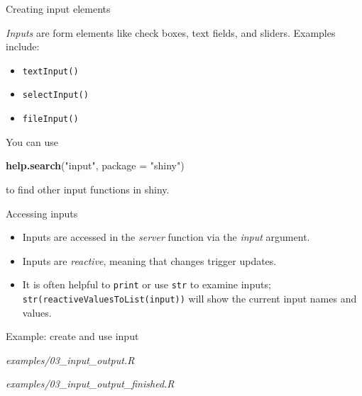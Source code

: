 \documentclass[
  12pt,
  ignorenonframetext,
]{beamer}
\newenvironment{Shaded}{\begin{snugshade}}{\end{snugshade}}
\newcommand{\DataTypeTok}[1]{\textcolor[rgb]{0.13,0.29,0.53}{#1}}
\newcommand{\KeywordTok}[1]{\textcolor[rgb]{0.13,0.29,0.53}{\textbf{#1}}}
\newcommand{\NormalTok}[1]{#1}
\newcommand{\StringTok}[1]{\textcolor[rgb]{0.31,0.60,0.02}{#1}}
\providecommand{\tightlist}{%
  \setlength{\itemsep}{0pt}\setlength{\parskip}{0pt}}
\begin{document}
\begin{frame}[fragile]{Creating input elements}
\protect\hypertarget{creating-input-elements}{}

\emph{Inputs} are form elements like check boxes, text fields, and
sliders. Examples include:

\begin{itemize}
\item
  \texttt{textInput()}
\item
  \texttt{selectInput()}
\item
  \texttt{fileInput()}
\end{itemize}

You can use

\begin{Shaded}
\begin{Highlighting}[]
\KeywordTok{help.search}\NormalTok{(}\StringTok{"input"}\NormalTok{, }\DataTypeTok{package =} \StringTok{"shiny"}\NormalTok{)}
\end{Highlighting}
\end{Shaded}

to find other input functions in shiny.

\end{frame}

\begin{frame}[fragile]{Accessing inputs}
\protect\hypertarget{accessing-inputs}{}

\begin{itemize}
\item
  Inputs are accessed in the \emph{server} function via the \emph{input}
  argument.
\item
  Inputs are \emph{reactive}, meaning that changes trigger updates.
\item
  It is often helpful to \texttt{print} or use \texttt{str} to examine
  inputs; \texttt{str(reactiveValuesToList(input))} will show the
  current input names and values.
\end{itemize}

\end{frame}

\begin{frame}{Example: create and use input}
\protect\hypertarget{example-create-and-use-input}{}

\begin{description}
\tightlist
\item[Start]
\emph{examples/03\_input\_output.R}
\item[Finished]
\emph{examples/03\_input\_output\_finished.R}
\end{description}

\end{frame}
\end{document}
